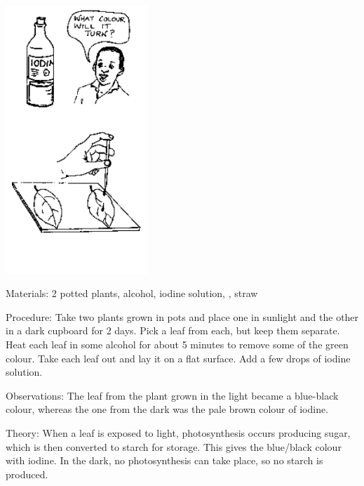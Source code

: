 \begin{multicols}{2}
\begin{center}
\includegraphics[width=0.4\textwidth]{./img/source/photo-starch.png}
\end{center}

\begin{description*}
\item[Materials:]{2 potted plants, alcohol, iodine solution, , straw}
\item[Procedure:]{Take two plants grown in pots and place one in sunlight and the other in a dark cupboard
for 2 days. Pick a leaf from each, but keep them separate. Heat each leaf in some alcohol for about 5 minutes to remove some of the green colour. Take each leaf out and lay it on
a flat surface. Add a few drops of iodine solution.}
\item[Observations:]{The leaf from the plant grown in the light became a blue-black colour, whereas the one
from the dark was the pale brown colour of iodine.}
\item[Theory:]{When a leaf is exposed to light, photosynthesis occurs producing sugar, which is then
converted to starch for storage. This gives the blue/black colour with iodine. In the dark, no
photosynthesis can take place, so no starch is produced.}
\end{description*}


\end{multicols}
